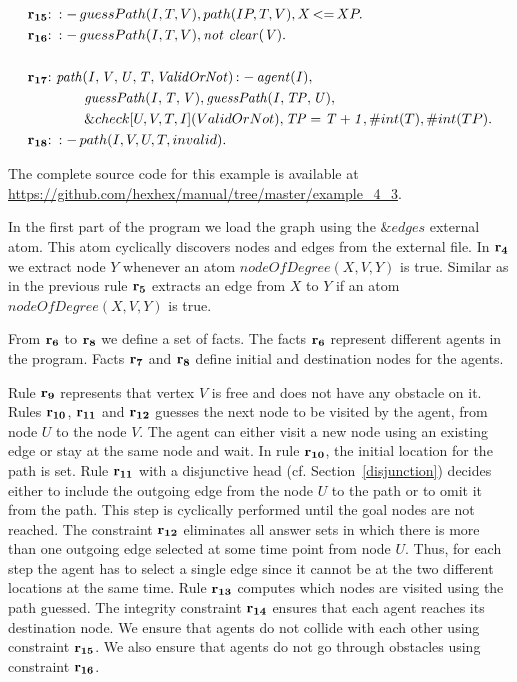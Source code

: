 \documentclass[a4paper, titlepage]{article}
\newcommand{\ext}[3]{\ensuremath{\&{#1}[#2](#3)}}
\DeclareMathOperator{\leftimpl}{:-}
\DeclareMathOperator{\nott}{\mathit{not}}
\DeclareMathOperator{\lesseq}{<=}
\newcommand{\examplelink}[1]{\url{https://github.com/hexhex/manual/tree/master/#1}}
\newcommand{\row}[1]{%
  \ensuremath{\color{black}\ensuremath{\mathbf{#1}} \color{black}}%
}
\newcommand{\rowprefix}[1]{%
  \ensuremath{\color{black}\mathbf{#1{:}}\ }%
}
\begin{document}
\begin{exmp}
\begin{align*}
\rowprefix{r_{15}} &  \leftimpl guessPath(I, T, V), 
path(IP,T,V), X \lesseq XP. \\
\rowprefix{r_{16}} &  \leftimpl guessPath(I,T,V), \nott \thinspace  
\mathit{clear(V).}\\
\\
\rowprefix{r_{17}} &  \mathit{path(I,V,U,T,ValidOrNot)} 
\leftimpl \mathit{agent(I)}, \\ & \qquad \mathit{guessPath(I, T, 
V)}, \mathit{guessPath(I, TP, U)}, \\ & \qquad \ext{check}{U, 
V, T, I}{ValidOrNot}, \mathit{TP=T+1}, \#int(T), 
\#int(TP).  \\
\rowprefix{r_{18}} & \leftimpl path(I, V, U, T, invalid). 
\end{align*}
\end{exmp}
The complete source code for this example is available at \examplelink{example_4_3}.

In the first part of the program we load the graph using 
the $\&edges$ external atom. This atom cyclically discovers 
nodes and edges from the external file. In $\row{r_4}$ we 
extract node $Y$ whenever an atom $\mathit{nodeOfDegree(X, 
V, Y)}$ is true. Similar as in the previous rule $\row{r_5}$ extracts an edge from $X$ to $Y$ if an atom 
$\mathit{nodeOfDegree(X, V,Y)}$ is true. 

From $\row{r_6}$ to $\row{r_8}$ we define a set of facts. 
The facts $\row{r_6}$ represent different agents in the program. 
Facts $\row{r_7}$ and $\row{r_8}$ define initial and 
destination nodes for the agents.  

Rule $\row{r_9}$ 
represents that vertex $V$ is free and does not have any 
obstacle on it. Rules $\row{r_{10}}$, $\row{r_{11}}$ and 
$\row{r_{12}}$ guesses the next node to be visited by the agent, from 
node $U$ to the node $V$. The agent can either visit a new node 
using an existing edge or stay at the same node and wait. 
In rule $\row{r_{10}}$, the initial location for the path is set. Rule $\row{r_{11}}$ 
with a disjunctive head (cf. Section~\ref{disjunction}) decides either to include the outgoing edge 
from the node $U$ to the path or to omit it from the path. 
This step is cyclically performed until the goal nodes are not 
reached. The constraint $\row{r_{12}}$ eliminates all answer sets in which there is more than one outgoing edge 
selected at some time point from node $U$. Thus, for each step 
the agent has to select a single edge since it cannot be at the 
two different locations at the same time. Rule $\row{\row{r_{13}}}$ computes which nodes are visited using the path 
guessed. The integrity constraint $\row{r_{14}}$ ensures that 
each agent reaches its destination node. We ensure that 
agents do not collide with each other using constraint 
$\row{r_{15}}$. We also ensure that agents do not go through 
obstacles using constraint $\row{r_{16}}$. 
\end{document}
